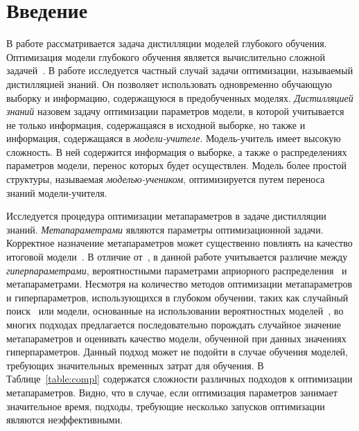\documentclass[12pt]{a&t}
\begin{document}
\section{Введение}

В работе рассматривается задача дистилляции моделей глубокого обучения. Оптимизация модели глубокого обучения является вычислительно сложной задачей~\cite{rasley2020deepspeed}. В работе исследуется частный случай задачи оптимизации, называемый дистилляцией знаний. Он позволяет использовать одновременно обучающую выборку и информацию, содержащуюся в предобученных моделях. \textit{Дистилляцией знаний} \cite{journals/corr/HintonVD15} назовем задачу оптимизации параметров модели, в которой учитывается не только информация, содержащаяся в исходной выборке, но также и  информация, содержащаяся в \textit{модели-учителе}. Модель-учитель имеет высокую сложность. В ней содержится информация о выборке, а также о распределениях параметров модели, перенос которых будет осуществлен. Модель более простой структуры, называемая \textit{моделью-учеником}, оптимизируется путем переноса знаний модели-учителя.


Исследуется процедура оптимизации метапараметров в задаче дистилляции знаний.  \textit{Метапараметрами} являются параметры оптимизационной задачи. Корректное назначение метапараметров может существенно повлиять на качество итоговой модели~\cite{journals/corr/Pedregosa16}. В отличие от~\cite{journals/corr/Pedregosa16,journals/corr/MaclaurinDA15}, в данной работе учитывается различие между \textit{гиперпараметрами}, вероятностными параметрами априорного распределения~\cite{bishop2006pattern} и метапараметрами. Несмотря на количество методов оптимизации метапараметров и гиперпараметров, использующихся в глубоком обучении, таких как случайный поиск~\cite{bergstra2012random} или модели, основанные на использовании вероятностных моделей~\cite{bergstra2013making}, во многих подходах предлагается последовательно порождать случайное значение метапараметров и оценивать качество модели, обученной при данных значениях гиперпараметров. Данный подход может не подойти в случае обучения моделей, требующих значительных временных затрат для обучения. В Таблице~\ref{table:compl} содержатся сложности различных подходов к оптимизации метапараметров. Видно, что в случае, если оптимизация параметров занимает значительное время, подходы, требующие несколько запусков оптимизации являются неэффективными.
\end{document}
